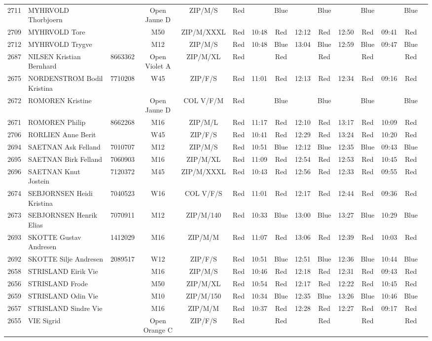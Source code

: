 \documentclass{report}
\begin{document}
\begin{longtable}{|c|l|r|c|c|*{5}{cc|}}
    2711 & MYHRVOLD Thorbjoern &  & Open Jaune D & ZIP/M/S & Red &   & Blue &   & Blue &   & Blue &   & Blue &  \\
    2709 & MYHRVOLD Tore &  & M50 & ZIP/M/XXXL & Red & 10:48 & Red & 12:12 & Red & 12:50 & Red & 09:41 & Red &  \\
    2712 & MYHRVOLD Trygve &  & M12 & ZIP/M/S & Red & 10:48 & Blue & 13:04 & Blue & 12:59 & Blue & 09:47 & Blue &  \\
    2687 & NILSEN Kristian Bernhard & 8663362 & Open Violet A & ZIP/M/XL & Red &   & Red &   & Red &   & Red &   & Red &  \\
    2675 & NORDENSTROM Bodil Kristina & 7710208 & W45 & ZIP/F/S & Red & 11:01 & Red & 12:13 & Red & 12:34 & Red & 09:16 & Red &  \\
    2672 & ROMOREN Kristine &  & Open Jaune D & COL V/F/M & Red &   & Blue &   & Blue &   & Blue &   & Blue &  \\
    2671 & ROMOREN Philip & 8662268 & M16 & ZIP/M/L & Red & 11:17 & Red & 12:10 & Red & 13:17 & Red & 10:09 & Red &  \\
    2706 & RORLIEN Anne Berit &  & W45 & ZIP/F/S & Red & 10:41 & Red & 12:29 & Red & 13:24 & Red & 10:20 & Red &  \\
    2694 & SAETNAN Ask Felland & 7010707 & M12 & ZIP/M/S & Red & 10:51 & Blue & 12:12 & Blue & 12:35 & Blue & 09:43 & Blue &  \\
    2695 & SAETNAN Birk Felland & 7060903 & M16 & ZIP/M/XL & Red & 11:09 & Red & 12:54 & Red & 12:53 & Red & 10:45 & Red &  \\
    2696 & SAETNAN Knut Jostein & 7120372 & M45 & ZIP/M/XXXL & Red & 10:43 & Red & 12:56 & Red & 12:33 & Red & 09:55 & Red &  \\
    2674 & SEBJORNSEN Heidi Kristina & 7040523 & W16 & COL V/F/S & Red & 11:01 & Red & 12:17 & Red & 12:44 & Red & 09:36 & Red &  \\
    2673 & SEBJORNSEN Henrik Elias & 7070911 & M12 & ZIP/M/140 & Red & 10:33 & Blue & 13:00 & Blue & 13:27 & Blue & 10:29 & Blue &  \\
    2693 & SKOTTE Gustav Andresen & 1412029 & M16 & ZIP/M/M & Red & 11:07 & Red & 13:06 & Red & 12:39 & Red & 10:03 & Red &  \\
    2692 & SKOTTE Silje Andresen & 2089517 & W12 & ZIP/F/S & Red & 10:51 & Blue & 12:51 & Blue & 12:36 & Blue & 10:44 & Blue &  \\
    2658 & STRISLAND Eirik Vie &  & M16 & ZIP/M/S & Red & 10:46 & Red & 12:18 & Red & 12:31 & Red & 09:43 & Red &  \\
    2656 & STRISLAND Frode &  & M50 & ZIP/M/XL & Red & 10:54 & Red & 12:17 & Red & 12:22 & Red & 10:45 & Red &  \\
    2659 & STRISLAND Odin Vie &  & M10 & ZIP/M/150 & Red & 10:34 & Blue & 12:35 & Blue & 13:26 & Blue & 10:46 & Blue &  \\
    2657 & STRISLAND Sindre Vie &  & M16 & ZIP/M/M & Red & 10:37 & Red & 12:28 & Red & 12:27 & Red & 09:17 & Red &  \\
    2655 & VIE Sigrid &  & Open Orange C & ZIP/F/S & Red &   & Red &   & Red &   & Red &   & Red &  \\
  \end{longtable}
\end{document}
